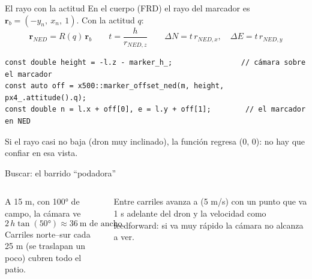 \begin{frame}[fragile]{El rayo con la actitud}
  \small En el cuerpo (FRD) el rayo del marcador es $\mathbf{r}_b = (-y_n,\ x_n,\ 1)$. Con la actitud $q$:
  \[ \mathbf{r}_{NED} = R(q)\,\mathbf{r}_b \qquad t = \frac{h}{r_{NED,z}} \qquad
     \Delta N = t\,r_{NED,x},\quad \Delta E = t\,r_{NED,y} \]
  \begin{lstlisting}[style=cpp,caption={Así se usa (ya está en las misiones)}]
const double height = -l.z - marker_h_;                // cámara sobre el marcador
const auto off = x500::marker_offset_ned(m, height, px4_.attitude().q);
const double n = l.x + off[0], e = l.y + off[1];        // el marcador en NED
  \end{lstlisting}
  \footnotesize Si el rayo casi no baja (dron muy inclinado), la función regresa (0, 0): no hay que confiar en esa vista.
\end{frame}



\begin{frame}{Buscar: el barrido ``podadora''}
  \begin{columns}[c]
    \centering
    \small
    A 15 m, con 100° de campo, la cámara ve
    \[ 2\,h\tan(50°) \approx 36\ \text{m de ancho} \]
    Carriles norte--sur cada 25 m (se traslapan un poco) cubren todo el patio.
    \vspace{0.3em}

    Entre carriles avanza a  (5 m/s) con un punto que va 1 s adelante del dron y
    la velocidad como feedforward: si va muy rápido la cámara no alcanza a ver.
  \end{columns}
\end{frame}

